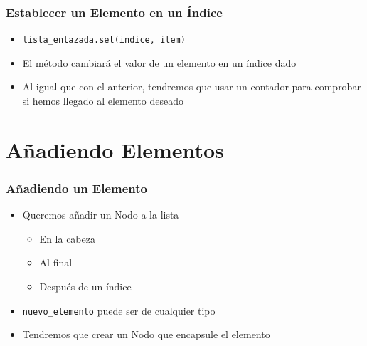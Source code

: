 \documentclass[11pt]{beamer}
\begin{document}
	\begin{frame}[fragile]
	\frametitle{Establecer un Elemento en un Índice}
		\begin{itemize}
			\item \lstinline|lista_enlazada.set(indice, item)|
			\item El método cambiará el valor de un elemento en un índice dado
			\item Al igual que con el anterior, tendremos que usar un contador para comprobar si hemos llegado al elemento deseado
		\end{itemize}
\end{frame}


\section{Añadiendo Elementos}

	\begin{frame}
		\frametitle{Añadiendo un Elemento}
		\begin{itemize}
			\item Queremos añadir un Nodo a la lista
			\begin{itemize}
				\item En la cabeza
				\item Al final
				\item Después de un índice
			\end{itemize}
			\item \texttt{nuevo\_elemento} puede ser de cualquier tipo
			\item Tendremos que crear un Nodo que encapsule el elemento
		\end{itemize}
		\vspace{0.7cm}
		\begin{center}
		\end{center}
	\end{frame}
\end{document}
